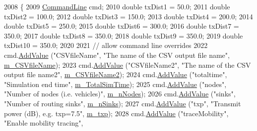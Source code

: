 \begin{DoxyCode}
2008 \{
2009   \hyperlink{classns3_1_1CommandLine}{CommandLine} cmd;
2010   \textcolor{keywordtype}{double} txDist1 = 50.0;
2011   \textcolor{keywordtype}{double} txDist2 = 100.0;
2012   \textcolor{keywordtype}{double} txDist3 = 150.0;
2013   \textcolor{keywordtype}{double} txDist4 = 200.0;
2014   \textcolor{keywordtype}{double} txDist5 = 250.0;
2015   \textcolor{keywordtype}{double} txDist6 = 300.0;
2016   \textcolor{keywordtype}{double} txDist7 = 350.0;
2017   \textcolor{keywordtype}{double} txDist8 = 350.0;
2018   \textcolor{keywordtype}{double} txDist9 = 350.0;
2019   \textcolor{keywordtype}{double} txDist10 = 350.0;
2020 
2021   \textcolor{comment}{// allow command line overrides}
2022   cmd.\hyperlink{classns3_1_1CommandLine_addcfb546c7ad4c8bd0965654d55beb8e}{AddValue} (\textcolor{stringliteral}{"CSVfileName"}, \textcolor{stringliteral}{"The name of the CSV output file name"}, 
      \hyperlink{classVanetRoutingExperiment_a0fab315c81d7da9e59216c3790f55da4}{m\_CSVfileName});
2023   cmd.\hyperlink{classns3_1_1CommandLine_addcfb546c7ad4c8bd0965654d55beb8e}{AddValue} (\textcolor{stringliteral}{"CSVfileName2"}, \textcolor{stringliteral}{"The name of the CSV output file name2"}, 
      \hyperlink{classVanetRoutingExperiment_a8ad342a946c50fa946eeb20fddfd2adc}{m\_CSVfileName2});
2024   cmd.\hyperlink{classns3_1_1CommandLine_addcfb546c7ad4c8bd0965654d55beb8e}{AddValue} (\textcolor{stringliteral}{"totaltime"}, \textcolor{stringliteral}{"Simulation end time"}, \hyperlink{classVanetRoutingExperiment_acae630bc30645931dcb68283b0217b1b}{m\_TotalSimTime});
2025   cmd.\hyperlink{classns3_1_1CommandLine_addcfb546c7ad4c8bd0965654d55beb8e}{AddValue} (\textcolor{stringliteral}{"nodes"}, \textcolor{stringliteral}{"Number of nodes (i.e. vehicles)"}, \hyperlink{classVanetRoutingExperiment_ac2bf996dc9fe3163f8a720acbf4f6f85}{m\_nNodes});
2026   cmd.\hyperlink{classns3_1_1CommandLine_addcfb546c7ad4c8bd0965654d55beb8e}{AddValue} (\textcolor{stringliteral}{"sinks"}, \textcolor{stringliteral}{"Number of routing sinks"}, \hyperlink{classVanetRoutingExperiment_ab17a92877232a685d02e7980368e6ba5}{m\_nSinks});
2027   cmd.\hyperlink{classns3_1_1CommandLine_addcfb546c7ad4c8bd0965654d55beb8e}{AddValue} (\textcolor{stringliteral}{"txp"}, \textcolor{stringliteral}{"Transmit power (dB), e.g. txp=7.5"}, \hyperlink{classVanetRoutingExperiment_a8acdb7cf31487aa0d721263fde2a7f3e}{m\_txp});
2028   cmd.\hyperlink{classns3_1_1CommandLine_addcfb546c7ad4c8bd0965654d55beb8e}{AddValue} (\textcolor{stringliteral}{"traceMobility"}, \textcolor{stringliteral}{"Enable mobility tracing"}, 

\end{DoxyCode}
